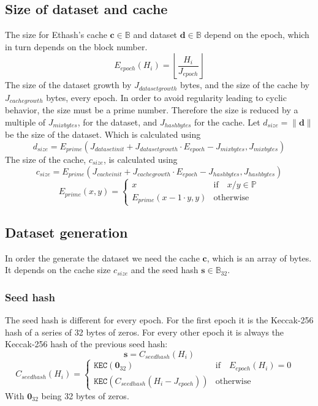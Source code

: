 \documentclass[9pt,oneside]{amsart}
\begin{document}
\subsection{Size of dataset and cache}
The size for Ethash's cache $\mathbf{c} \in \mathbb{B}$  and dataset $\mathbf{d} \in \mathbb{B}$ depend on the epoch, which in turn depends on the block number.
\begin{equation}
 E_{epoch}(H_i) = \left\lfloor\frac{H_i}{J_{epoch}}\right\rfloor
\end{equation}
The size of the dataset growth by $J_{datasetgrowth}$ bytes, and the size of the cache by $J_{cachegrowth}$ bytes, every epoch. In order to avoid regularity leading to cyclic behavior, the size must be a prime number. Therefore the size is reduced by a multiple of $J_{mixbytes}$, for the dataset, and $J_{hashbytes}$ for the cache.
Let $d_{size} = \lVert \mathbf{d} \rVert$ be the size of the dataset. Which is calculated using
\begin{equation}
 d_{size} = E_{prime}(J_{datasetinit} + J_{datasetgrowth} \cdot E_{epoch} - J_{mixbytes}, J_{mixbytes})
\end{equation}
The size of the cache, $c_{size}$, is calculated using
\begin{equation}
 c_{size} = E_{prime}(J_{cacheinit} + J_{cachegrowth} \cdot E_{epoch} - J_{hashbytes}, J_{hashbytes})
\end{equation}
\begin{equation}
 E_{prime}(x, y) = \begin{cases}
x & \text{if} \quad x / y \in \mathbb{P} \\
E_{prime}(x - 1 \cdot y, y) & \text{otherwise}
\end{cases}
\end{equation}
\subsection{Dataset generation}
In order the generate the dataset we need the cache $\mathbf{c}$, which is an array of bytes. It depends on the cache size  $c_{size}$ and the seed hash $\mathbf{s} \in \mathbb{B}_{32}$.
\subsubsection{Seed hash}
The seed hash is different for every epoch. For the first epoch it is the Keccak-256 hash of a series of 32 bytes of zeros. For every other epoch it is always the Keccak-256 hash of the previous seed hash:
\begin{equation}
 \mathbf{s} = C_{seedhash}(H_i)
\end{equation}
\begin{equation}
 C_{seedhash}(H_i) = \begin{cases}
\texttt{KEC}(\mathbf{0}_{32}) & \text{if} \quad E_{epoch}(H_i) = 0 \quad  \\
\texttt{KEC}(C_{seedhash}(H_i - J_{epoch})) & \text{otherwise}
\end{cases}
\end{equation}
With $\mathbf{0}_{32}$ being 32 bytes of zeros.
\end{document}
